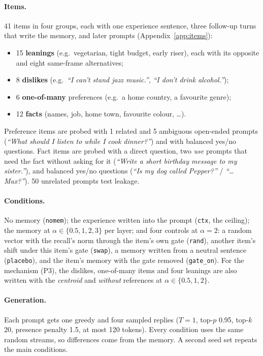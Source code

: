 \documentclass[11pt]{article}
\begin{document}
\paragraph{Items.} 41 items in four groups, each with one experience sentence, three follow-up turns that write the memory, and later prompts (Appendix~\ref{app:items}):
\begin{itemize}
  \item 15 \textbf{leanings} (e.g.\ vegetarian, tight budget, early riser), each with its opposite and eight same-frame alternatives;
  \item 8 \textbf{dislikes} (e.g.\ \textit{``I can't stand jazz music.''}, \textit{``I don't drink alcohol.''});
  \item 6 \textbf{one-of-many} preferences (e.g.\ a home country, a favourite genre);
  \item 12 \textbf{facts} (names, job, home town, favourite colour, \ldots).
\end{itemize}
Preference items are probed with 1 related and 5 ambiguous open-ended prompts (\textit{``What should I listen to while I cook dinner?''}) and with balanced yes/no questions. Fact items are probed with a direct question, two \emph{use} prompts that need the fact without asking for it (\textit{``Write a short birthday message to my sister.''}), and balanced yes/no questions (\textit{``Is my dog called Pepper?''} / \textit{``\ldots{} Max?''}). 50 unrelated prompts test leakage.

\paragraph{Conditions.} No memory (\texttt{nomem}); the experience written into the prompt (\texttt{ctx}, the ceiling); the memory at $\alpha \in \{0.5, 1, 2, 3\}$ per layer; and four controls at $\alpha{=}2$: a random vector with the recall's norm through the item's own gate (\texttt{rand}), another item's shift under this item's gate (\texttt{swap}), a memory written from a neutral sentence (\texttt{placebo}), and the item's memory with the gate removed (\texttt{gate\_on}). For the mechanism (P3), the dislikes, one-of-many items and four leanings are also written with the \emph{centroid} and \emph{without} references at $\alpha \in \{0.5, 1, 2\}$.

\paragraph{Generation.} Each prompt gets one greedy and four sampled replies ($T{=}1$, top-$p$ 0.95, top-$k$ 20, presence penalty 1.5, at most 120 tokens). Every condition uses the same random streams, so differences come from the memory. A second seed set repeats the main conditions.
\end{document}
